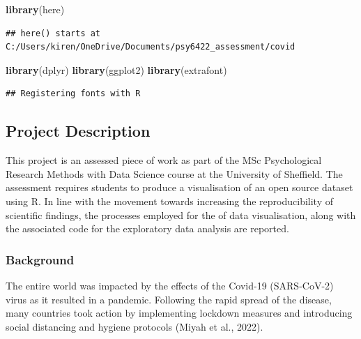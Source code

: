 \documentclass[
]{article}
\newenvironment{Shaded}{\begin{snugshade}}{\end{snugshade}}
\newcommand{\FunctionTok}[1]{\textcolor[rgb]{0.13,0.29,0.53}{\textbf{#1}}}
\newcommand{\NormalTok}[1]{#1}
\begin{document}
\begin{Shaded}
\begin{Highlighting}[]
\FunctionTok{library}\NormalTok{(here)}
\end{Highlighting}
\end{Shaded}

\begin{verbatim}
## here() starts at C:/Users/kiren/OneDrive/Documents/psy6422_assessment/covid
\end{verbatim}

\begin{Shaded}
\begin{Highlighting}[]
\FunctionTok{library}\NormalTok{(dplyr)}
\FunctionTok{library}\NormalTok{(ggplot2)}
\FunctionTok{library}\NormalTok{(extrafont)}
\end{Highlighting}
\end{Shaded}

\begin{verbatim}
## Registering fonts with R
\end{verbatim}

\subsection{Project Description}\label{project-description}

This project is an assessed piece of work as part of the MSc
Psychological Research Methods with Data Science course at the
University of Sheffield. The assessment requires students to produce a
visualisation of an open source dataset using R. In line with the
movement towards increasing the reproducibility of scientific findings,
the processes employed for the of data visualisation, along with the
associated code for the exploratory data analysis are reported.

\subsubsection{Background}\label{background}

The entire world was impacted by the effects of the Covid-19
(SARS-CoV-2) virus as it resulted in a pandemic. Following the rapid
spread of the disease, many countries took action by implementing
lockdown measures and introducing social distancing and hygiene
protocols (Miyah et al., 2022).
\end{document}
